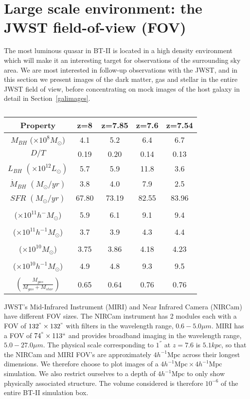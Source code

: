 \documentclass[twocolumn,useAMS,usenatbib]{mnras} \usepackage{natbib}
\newcommand{\hmpc}{\ensuremath{h^{-1}\mathrm{Mpc}}}
\begin{document}
\section{Large scale environment: the JWST field-of-view (FOV)} \label{S:checkfov}
  
The most luminous quasar in BT-II is located in a high density environment which will make it an interesting target for observations of the surrounding sky area. We are most interested in follow-up observations with the JWST, and in this section we present images of
the dark matter, gas and stellar in the entire JWST field of view, before concentrating on mock images of the host galaxy in detail in Section~\ref{galimages}. 

\begin{table}
\caption{\label{T:quasar_properties} }
\centering\begin{tabular}{ccccc}
\hline
 Property & z=8 & z=7.85 & z=7.6 & z=7.54\\
\hline
$M_{BH}$ ($\times 10^{8} 
M_{\odot}$) & 4.1 & 5.2 & 6.4 & 6.7 \\
$D/T$ & 0.19 & 0.20 & 0.14 & 0.13 \\
$L_{BH}$ $(\times 10^{12} L_{\odot})$ & 5.7 & 5.9 & 11.8 & 3.6 \\
$\dot{M}_{BH}$ $(M_{\odot}/yr)$ & 3.8 & 4.0 & 7.9 & 2.5 \\
$SFR$ $(M_{\odot}/yr)$ & 67.80 & 73.19 & 82.55 & 83.96 \\
\makecell{$M_{Halo}$ \\ ($\times 10^{11} h^{-}M_{\odot}$)} & 5.9 & 6.1 & 9.1 & 9.4 \\
\makecell{$M_{200}$ \\ ($\times 10^{11} h^{-1}M_{\odot}$)} & 3.7 & 3.9 & 4.3 & 4.4 \\
\makecell{$M_{star}$ \\ ($\times 10^{10} M_{\odot}$)} & 3.75 & 3.86 & 4.18 & 4.23 \\
\makecell{$M_{gas}$ \\ ($\times 10^{10} h^{-1} M_{\odot}$)} & 4.9 & 4.8 & 9.3 & 9.5 \\
\makecell{$f_{gas}$ \\$\left(\frac{M_{gas}}{M_{gas} + M_{star}}\right)$} & 0.65 & 0.64 & 0.76 & 0.76 \\
\hline
\end{tabular}
\end{table}

JWST's Mid-Infrared Instrument (MIRI) and Near Infrared Camera (NIRCam) have different FOV sizes. The  NIRCam instrument has 2 modules each with a FOV of $132^{``} \times 132^{``}$ with filters in the wavelength range, $0.6 - 5.0 \mu m$. MIRI has a FOV of $74^{``} \times 113{``}$ and provides broadband imaging in the wavelength range, $5.0 - 27.0 \mu m$.  The physical scale corresponding to $1^{''}$ at $z=7.6$ is $5.1 kpc$, so that the NIRCam and MIRI FOV's are approximately $4  \hmpc$ across their longest dimensions. We therefore choose to plot images of a $4  \hmpc \times 4  \hmpc$ 
simulation. We also restrict ourselves to a depth of $ 4 \hmpc$ to
only show physically associated structure. The volume considered is
therefore $10^{-6}$ of the entire BT-II simulation box.
\end{document}
